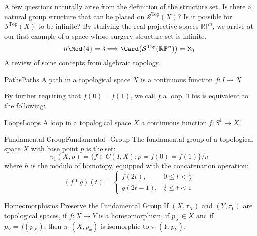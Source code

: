             A few questions naturally arise from the
            definition of the structure set. Is there a natural group
            structure that can be placed on $\mathcal{S}^{\textrm{Top}}(X)$?
            Is it possible for $\mathcal{S}^{\textrm{Top}}(X)$ to be infinite?
            By studying the real projective spaces $\mathbb{RP}^{n}$, we
            arrive at our first example of a space whose surgery structure
            set is infinite.
            \begin{equation}
                n\Mod{4}=3
                \Longrightarrow
                \Card\big(\mathcal{S}^{\textrm{Top}}(\mathbb{RP}^{n})\big)
                =\aleph_{0}
            \end{equation}
            A review of some concepts from algebraic topology.
            \begin{ldefinition}{Paths}{Paths}
                A path in a topological space $X$ is a
                continuous function $f:I\rightarrow{X}$
            \end{ldefinition}
            By further requiring that $f(0)=f(1)$, we call $f$ a loop. This is
            equivalent to the following:
            \begin{ldefinition}{Loops}{Loops}
                A loop in a topological space $X$ a continuous function
                $f:S^{1}\rightarrow{X}$.
            \end{ldefinition}
            \begin{ldefinition}{Fundamental Group}{Fundamental_Group}
                The fundamental group of a topological space
                $X$ with base point $p$ is the set:
                \begin{equation}
                    \pi_{1}(X,p)=
                    \{f\in{C(I,X)}:p=f(0)=f(1)\}/h
                \end{equation}
                where $h$ is the modulo of homotopy,
                equipped with the concatenation operation:
                \begin{equation}
                    (f*g)(t)=
                    \begin{cases}
                        f(2t),&0\leq{t}<\frac{1}{2}\\
                        g(2t-1),&\frac{1}{2}\leq{t}<1
                    \end{cases}
                \end{equation}
            \end{ldefinition}
            \begin{ltheorem}{Homeomorphisms Preserve the Fundamental Group}
                If $(X,\tau_{X})$ and $(Y,\tau_{Y})$ are topological spaces,
                if $f:X\rightarrow{Y}$ is a homeomorphism, if $p_{X}\in{X}$ and
                if $p_{Y}=f(p_{X})$, then $\pi_{1}(X,p_{x})$ is isomorphic
                to $\pi_{1}(Y,p_{Y})$.
            \end{ltheorem}
